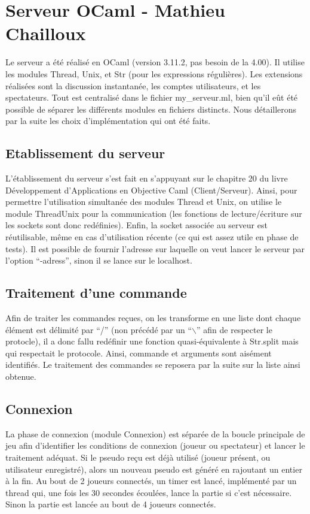 \documentclass[a4paper, 11pt]{report}
\begin{document}
\chapter{Serveur OCaml - Mathieu Chailloux}

Le serveur a été réalisé en OCaml (version 3.11.2, pas besoin de la 4.00). Il utilise les modules Thread, Unix, et Str (pour les expressions régulières).
Les extensions réalisées sont la discussion instantanée, les comptes utilisateurs, et les spectateurs. Tout est centralisé dans le fichier my\_serveur.ml, bien qu'il eût été possible de séparer les différents modules en fichiers distincts. Nous détaillerons par la suite les choix d'implémentation qui ont été faits.

\section{Etablissement du serveur}

L'établissement du serveur s'est fait en s'appuyant sur le chapitre 20 du livre Développement d'Applications en Objective Caml (Client/Serveur). Ainsi, pour permettre l'utilisation simultanée des modules Thread et Unix, on utilise le module ThreadUnix pour la communication (les fonctions de lecture/écriture sur les sockets sont donc redéfinies). Enfin, la socket associée au serveur est réutilisable, même en cas d'utilisation récente (ce qui est assez utile en phase de tests). Il est possible de fournir l'adresse sur laquelle on veut lancer le serveur par l'option ``-adress'', sinon il se lance sur le localhost.

\section{Traitement d'une commande}

Afin de traiter les commandes reçues, on les transforme en une liste dont chaque élément est délimité par ``/'' (non précédé par un ``$\backslash$'' afin de respecter le protocle), il a donc fallu redéfinir une fonction quasi-équivalente à Str.split mais qui respectait le protocole. Ainsi, commande et arguments sont aisément identifiés. Le traitement des commandes se reposera par la suite sur la liste ainsi obtenue.

\section{Connexion}

La phase de connexion (module Connexion) est séparée de la boucle principale de jeu afin d'identifier les conditions de connexion (joueur ou spectateur) et lancer le traitement adéquat. Si le pseudo reçu est déjà utilisé (joueur présent, ou utilisateur enregistré), alors un nouveau pseudo est généré en rajoutant un entier à la fin. Au bout de 2 joueurs connectés, un timer est lancé, implémenté par un thread qui, une fois les 30 secondes écoulées, lance la partie si c'est nécessaire. Sinon la partie est lancée au bout de 4 joueurs connectés.
\end{document}
